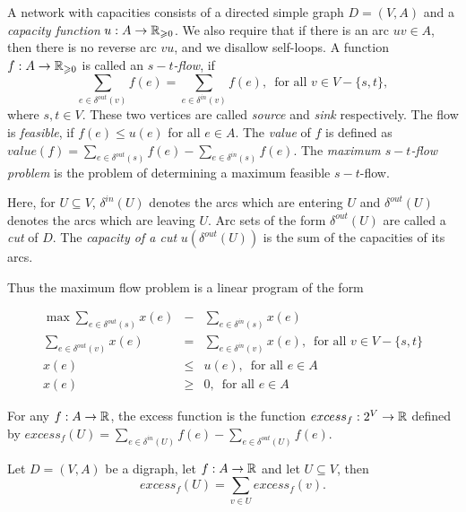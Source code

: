 \begin{definition}
  A network with capacities  consists of a directed simple graph
  $D=(V,A)$ and a   \emph{capacity function} $u:A\to\mathbb{R}_{\geqslant0}$. 
  We also require that if there is an arc $uv \in A$, then there is 
  no reverse arc $vu$, and we disallow self-loops. 
  A function $f:A\to\mathbb{R}_{\geqslant0}$ is   called an \emph{$s-t$-flow}, if 
  \begin{equation}
    \sum_{e \in \delta^{out}(v)} f(e) = \sum_{e \in \delta^{in}(v)} f(e), \, \mbox{ for all } v \in V - \{s,t\},
  \end{equation}
  where $s,t\in V$. These two vertices are called \emph{source} and 
  \emph{sink} respectively. 
  The flow is \emph{feasible}, if $f(e) \leq u(e)$ for all
  $e \in A$. 
  The \emph{value} of $f$ is defined as 
  $value(f) =  \sum_{e \in \delta^{out}(s)} f(e) - \sum_{e \in \delta^{in}(s)} f(e)$.
  The \emph{maximum $s-t$-flow problem} is the problem of determining
  a maximum feasible $s-t$-flow. 
\end{definition}


Here, for $U \subseteq V$, $\delta^{in}(U)$ denotes the arcs which are entering $U$
and $\delta^{out}(U)$ denotes the arcs which are leaving $U$.   Arc sets
of the form $\delta^{out}(U)$   are called a \emph{cut} of $D$. The
\emph{capacity of a cut } $u(\delta^{out}(U))$ is the sum of the capacities of
its arcs. 


Thus the maximum  flow problem is a linear program of the form 

\begin{eqnarray}
  \max \sum_{e \in \delta^{out}(s)} x(e) & - &   \sum_{e \in \delta^{in}(s)} x(e) \\
   \sum_{e \in \delta^{out}(v)} x(e) & = &  \sum_{e \in \delta^{in}(v)} x(e), \, \mbox{ for all
   } v \in V-\{s,t\} \\
   x(e) & \leq & u (e) , \, \mbox{ for all
   } e \in A \\
   x(e) & \geq & 0 , \, \mbox{ for all
   } e \in A
\end{eqnarray}


\begin{definition}
  For any $f:A \to \mathbb{R}$, the excess function is the function 
  $excess_f:  2^V \to \mathbb{R}$  defined by $excess_f(U) = \sum_{e \in \delta^{in}(U)}
  f(e) - \sum_{e \in \delta^{out}(U)} f(e)$. 
\end{definition}


\begin{theorem}
\label{f:thr:6}
Let $D = (V,A)$ be a digraph, let $f:A\to\mathbb{R}$ and let $U\subseteq V$, then
\begin{equation}
  \label{f:eq:28}
  excess_f(U) = \sum_{v \in U} excess_f(v).
\end{equation}  
\end{theorem}


